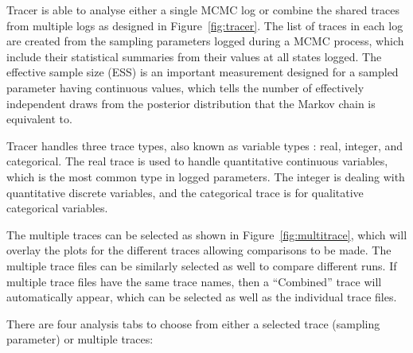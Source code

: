 \documentclass{bioinfo}
\begin{document}
Tracer is able to analyse either a single MCMC log or combine the shared traces from multiple logs as designed in Figure~\ref{fig:tracer}.
The list of traces in each log are created from the sampling parameters logged during a MCMC process, which include their statistical summaries from their values at all states logged.
The effective sample size (ESS) is an important measurement designed for a sampled parameter having continuous values, which tells the number of effectively independent draws from the posterior distribution that the Markov chain is equivalent to.

Tracer handles three trace types, also known as variable types \citep{mendenhall2012introduction}: real, integer, and categorical.
The real trace is used to handle quantitative continuous variables, which is the most common type in logged parameters.
The integer is dealing with quantitative discrete variables, and the categorical trace is for qualitative categorical variables.

The multiple traces can be selected as shown in Figure~\ref{fig:multitrace}, which will overlay the plots for the different traces allowing comparisons to be made. The multiple trace files can be similarly selected as well to compare different runs. If multiple trace files have the same trace names,  then a ``Combined'' trace will automatically appear, which can be selected as well as the individual trace files.

There are four analysis tabs to choose from either a selected trace (sampling parameter) or multiple traces:
\end{document}
